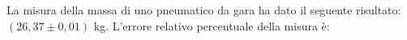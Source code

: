 La misura della massa di uno pneumatico da gara ha dato il
seguente risultato: $(26,37 \pm 0,01)$ kg. L'errore relativo 
percentuale della misura è: